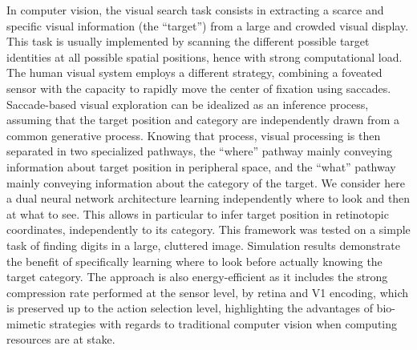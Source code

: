 In computer vision, the visual search task consists in extracting a scarce and specific visual information (the ``target'') from a large and crowded visual display. This task is usually implemented by scanning the different possible target identities at all possible spatial positions, hence with strong computational load. The human visual system employs a different strategy, combining a foveated sensor with the capacity to rapidly move the center of fixation using saccades. Saccade-based visual exploration can be idealized as an inference process, assuming that the target position and category are independently drawn from a common generative process. Knowing that process, visual processing is then separated in two specialized pathways, the ``where'' pathway mainly conveying information about target position in peripheral space, and the ``what'' pathway mainly conveying information about the category of the target. We consider here a dual neural network architecture learning independently where to look and then at what to see. This allows in particular to infer target position in retinotopic coordinates, independently to its category. This framework was tested on a simple task of finding digits in a large, cluttered image. Simulation results demonstrate the benefit of specifically learning where to look before actually knowing the target category. The approach is also energy-efficient as it includes the strong compression rate performed at the sensor level, by retina and V1 encoding, which is preserved up to the action selection level, highlighting the advantages of bio-mimetic strategies with regards to traditional computer vision when computing resources are at stake.
